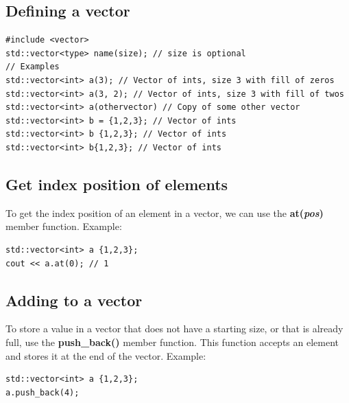 \documentclass{report}
\begin{document}
    \bigbreak \noindent 
    \subsection{Defining a vector}
    \bigbreak \noindent 
    \sepline
    \begin{verbatim}
#include <vector>
std::vector<type> name(size); // size is optional 
// Examples
std::vector<int> a(3); // Vector of ints, size 3 with fill of zeros
std::vector<int> a(3, 2); // Vector of ints, size 3 with fill of twos
std::vector<int> a(othervector) // Copy of some other vector
std::vector<int> b = {1,2,3}; // Vector of ints
std::vector<int> b {1,2,3}; // Vector of ints
std::vector<int> b{1,2,3}; // Vector of ints
    \end{verbatim}
    \sepline
    \bigbreak \noindent 

    \bigbreak \noindent 
    \subsection{Get index position of elements}
    \bigbreak \noindent 
    To get the index position of an element in a vector, we can use the \textbf{at(\textit{pos})} member function.
    \bigbreak \noindent 
    Example:
    \bigbreak \noindent 
    \sepline
    \begin{verbatim}
std::vector<int> a {1,2,3};
cout << a.at(0); // 1
    \end{verbatim}
    \sepline

    \bigbreak \noindent 
    \subsection{Adding to a vector}
    \bigbreak \noindent 
    To store a value in a vector that does not have a starting size, or that is already full, use the \textbf{push\_back()} member function. This function accepts an element and stores it at the end of the vector.
    \bigbreak \noindent 
    Example:
    \bigbreak \noindent 
    \sepline
    \begin{verbatim}
std::vector<int> a {1,2,3};
a.push_back(4);
    \end{verbatim}
    \sepline
\end{document}
